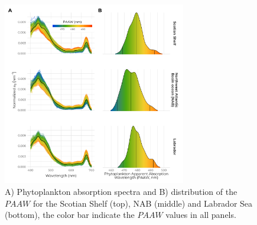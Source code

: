 \documentclass[utf8]{frontiersSCNS} %
\begin{document}
\begin{figure}[h!]
\begin{center}
\includegraphics[width=8cm]{fig07.pdf}
\end{center}
\caption{A) Phytoplankton absorption spectra and B) distribution of the $PAAW$ for the Scotian Shelf (top), NAB (middle) and Labrador Sea (bottom), the color bar indicate the $PAAW$ values in all panels.}\label{fig:7}
\end{figure}
\end{document}

